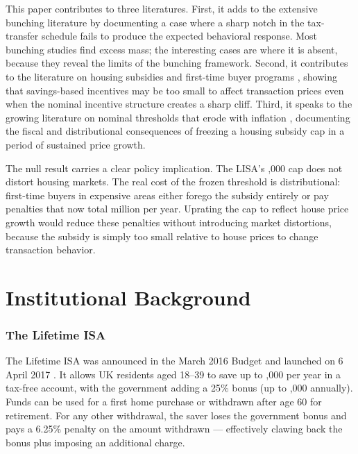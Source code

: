 \documentclass[12pt]{article}
\begin{document}
This paper contributes to three literatures. First, it adds to the extensive bunching literature \citep{chetty2011, kleven2016, best2018} by documenting a case where a sharp notch in the tax-transfer schedule fails to produce the expected behavioral response. Most bunching studies find excess mass; the interesting cases are where it is absent, because they reveal the limits of the bunching framework. Second, it contributes to the literature on housing subsidies and first-time buyer programs \citep{hilber2016, grimes2010, eerola2021}, showing that savings-based incentives may be too small to affect transaction prices even when the nominal incentive structure creates a sharp cliff. Third, it speaks to the growing literature on nominal thresholds that erode with inflation \citep{slemrod2013, auerbach2022}, documenting the fiscal and distributional consequences of freezing a housing subsidy cap in a period of sustained price growth.

The null result carries a clear policy implication. The LISA's ,000 cap does not distort housing markets. The real cost of the frozen threshold is distributional: first-time buyers in expensive areas either forego the subsidy entirely or pay penalties that now total  million per year. Uprating the cap to reflect house price growth would reduce these penalties without introducing market distortions, because the subsidy is simply too small relative to house prices to change transaction behavior.

\section{Institutional Background}

\subsubsection*{The Lifetime ISA} The Lifetime ISA was announced in the March 2016 Budget and launched on 6 April 2017 \citep{hmrc_isa_2025}. It allows UK residents aged 18--39 to save up to ,000 per year in a tax-free account, with the government adding a 25\% bonus (up to ,000 annually). Funds can be used for a first home purchase or withdrawn after age 60 for retirement. For any other withdrawal, the saver loses the government bonus and pays a 6.25\% penalty on the amount withdrawn --- effectively clawing back the bonus plus imposing an additional charge.
\end{document}
